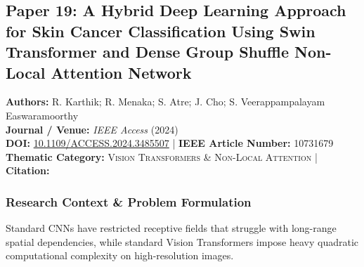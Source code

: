 \subsection{Paper 19: A Hybrid Deep Learning Approach for Skin Cancer Classification Using Swin Transformer and Dense Group Shuffle Non-Local Attention Network}
\label{sec:paper_19}

\begin{tcolorbox}[colback=gray!5!white,colframe=gray!75!black,title=\textbf{Metadata \& Citation Summary}]
\textbf{Authors:} R. Karthik; R. Menaka; S. Atre; J. Cho; S. Veerappampalayam Easwaramoorthy \\
\textbf{Journal / Venue:} \textit{IEEE Access} (2024) \\
\textbf{DOI:} \href{https://doi.org/10.1109/ACCESS.2024.3485507}{10.1109/ACCESS.2024.3485507} \quad | \quad \textbf{IEEE Article Number:} 10731679 \\
\textbf{Thematic Category:} \textsc{Vision Transformers \& Non-Local Attention} \quad | \quad \textbf{Citation:} \cite{10731679}
\end{tcolorbox}

\subsubsection*{Research Context \& Problem Formulation}
Standard CNNs have restricted receptive fields that struggle with long-range spatial dependencies, while standard Vision Transformers impose heavy quadratic computational complexity on high-resolution images.

